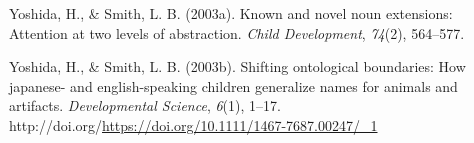 \documentclass[10pt, letterpaper]{article}
\newenvironment{CSLReferences}%
  {}%
  {\par}
\begin{document}
\begin{CSLReferences}{1}{0}
\leavevmode{}%
Yoshida, H., \& Smith, L. B. (2003a). Known and novel noun extensions:
Attention at two levels of abstraction. \emph{Child Development},
\emph{74}(2), 564--577.

\leavevmode{}%
Yoshida, H., \& Smith, L. B. (2003b). Shifting ontological boundaries:
How japanese- and english-speaking children generalize names for animals
and artifacts. \emph{Developmental Science}, \emph{6}(1), 1--17.
http://doi.org/\url{https://doi.org/10.1111/1467-7687.00247/_1}

\end{CSLReferences}


\end{document}
